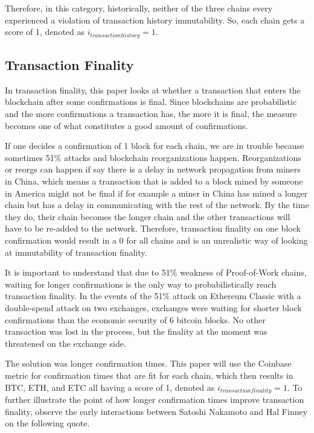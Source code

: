 \documentclass{article}
\begin{document}
Therefore, in this category, historically, neither of the three chains every experienced a violation of transaction history immutability. So, each chain gets a score of 1, denoted as $i_{transaction history} = 1$.

\subsection{Transaction Finality}
In transaction finality, this paper looks at whether a transaction that enters the blockchain after some confirmations is final. Since blockchains are probabilistic and the more confirmations a transaction has, the more it is final, the measure becomes one of what constitutes a good amount of confirmations.

If one decides a confirmation of 1 block for each chain, we are in trouble because sometimes 51\% attacks and blockchain reorganizations\cite{reorg} happen. Reorganizations or reorgs can happen if say there is a delay in network propagation from miners in China, which means a transaction that is added to a block mined by someone in America might not be final if for example a miner in China has mined a longer chain but has a delay in communicating with the rest of the network. By the time they do, their chain becomes the longer chain and the other transactions will have to be re-added to the network. Therefore, transaction finality on one block confirmation would result in a 0 for all chains and is an unrealistic way of looking at immutability of transaction finality.

It is important to understand that due to 51\% weakness of Proof-of-Work chains, waiting for longer confirmations is the only way to probabilistically reach transaction finality. In the events of the 51\% attack on Ethereum Classic\cite{51per} with a double-spend attack on two exchanges, exchanges were waiting for shorter block confirmations than the economic security of 6 bitcoin blocks\cite{bitconf}. No other transaction was lost in the process, but the finality at the moment was threatened on the exchange side.

The solution was longer confirmation times. This paper will use the Coinbase metric for confirmation times\cite{confirmations} that are fit for each chain, which then results in BTC, ETH, and ETC all having a score of 1, denoted as $i_{transaction finality} = 1$. To further illustrate the point of how longer confirmation times improve transaction finality, observe the early interactions between Satoshi Nakamoto and Hal Finney\cite{maillist} on the following quote.
\end{document}
